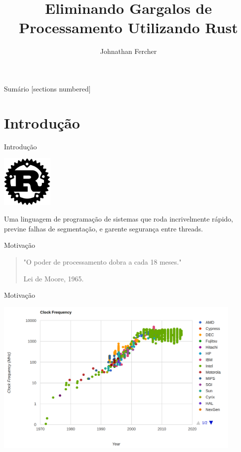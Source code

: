 \documentclass[aspectratio=169]{beamer}
\title{Eliminando Gargalos de Processamento \newline Utilizando Rust}
\date{}
\author{Johnathan Fercher}
\begin{document}
\maketitle

\begin{frame}{Sumário}
  [sections numbered]
  \tableofcontents[hideallsubsections]
\end{frame}

\section{Introdução}
\begin{frame}{Introdução}
	\begin{center}
		\includegraphics[width=2.5cm]{imgs/rust.png}
	\end{center}

	Uma linguagem de programação de sistemas que roda incrivelmente rápido, previne falhas de segmentação, e garente segurança entre threads.
\end{frame}

\begin{frame}{Motivação}
	\begin{quote}
		\hspace{0.5cm}"O poder de processamento dobra a cada 18 meses."
		
		\hspace{8.2cm}Lei de Moore, 1965.
	\end{quote}
\end{frame}

\begin{frame}{Motivação}
	\begin{center}
		\includegraphics[width=12cm]{imgs/clock-rate-history.png}
	\end{center}
\end{frame}
\end{document}
